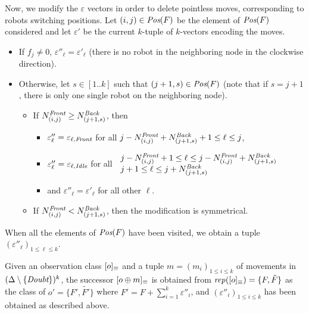  Now, we modify the $\varepsilon$ vectors  in order to delete pointless moves, corresponding to robots switching positions. 
 Let $(i, j)\in\textit{Pos}(F)$ be the element of $\textit{Pos}(F)$ considered and let $\varepsilon'$ be the current $k$-tuple of $k$-vectors
 encoding the moves. 
 \begin{itemize}
\item If $f_j\neq 0$, $\varepsilon''_\ell=\varepsilon'_\ell$ (there is no robot in the neighboring node in the clockwise direction). 
\item Otherwise, let $s \in [1..k]$ such that $(j+1, s)\in\textit{Pos}(F)$ (note that if $s=j+1$, there is only one single robot on the neighboring node). 
 \begin{itemize}
 \item If $N^{\textit{Front}}_{(i, j)}\geq N^{\textit{Back}}_{(j+1, s)}$, then 
 \begin{itemize}
 \item $\varepsilon''_\ell = \varepsilon_{\ell, \textit{Front}}$ for all $ j-N^{\textit{Front}}_{(i, j)}+N^{\textit{Back}}_{(j+1, s)}+1\leq \ell \leq j$, 
 \item $\varepsilon''_\ell=\varepsilon_{\ell, \textit{Idle}} $ for all $
 	\left.
  		\begin{array}{l}
    			 j-N^{\textit{Front}}_{(i, j)} +1 \leq \ell \leq j-N^{\textit{Front}}_{(i, j)}+  N^{\textit{Back}}_{(j+1, s)} \\
    			j+1 \leq \ell \leq j+N^{\textit{Back}}_{(j+1, s)} \\
  \end{array}
\right.$
 \item and $\varepsilon''_\ell=\varepsilon'_\ell$  for all other  $\ell$.
 \end{itemize}
 \item If $N^{\textit{Front}}_{(i, j)}< N^{\textit{Back}}_{(j+1, s)}$, then the modification is symmetrical. 
 \end{itemize}
 \end{itemize}
 When all the elements of $\textit{Pos}(F)$ have been visited, we obtain a tuple $(\varepsilon''_\ell)_{1\leq \ell \leq k}$.
 
 \begin{proposition}
Given an observation class $[o]_{\equiv}$ and a tuple $m=(m_i)_{1\leq i \leq k}$ of movements 
 in $(\Delta \setminus \{\textit{Doubt}\})^k$, the successor $[o \oplus m]_{\equiv}$ is obtained from $\mathit{rep}([o]_{\equiv})=\{F, \tilde{F}\}$ 
 as the class of $o' =\{F', \tilde{F'}\}$ where $F'= F+\sum_{i=1}^{k} \varepsilon''_i$, and $(\varepsilon''_i)_{1\leq i\leq k}$ has been 
 obtained as described above.
 \end{proposition}
 
